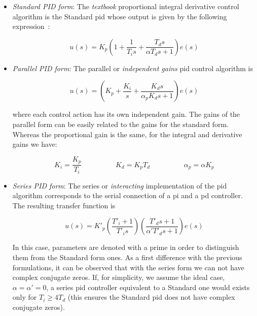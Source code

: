 \begin{itemize}
\item \emph{Standard PID form}: The \emph{textbook} proportional integral derivative control algorithm is the Standard \gls{pid} whose output is given by the following expression~\citep{astromhagglund1995}:

\begin{equation}
    u(s)= K_p \left( 1 + \frac{1}{T_i s} + \frac{T_d s}{\alpha T_d s+1} \right ) e(s)
    \label{eq:PIDstandard}
\end{equation}

\item \emph{Parallel PID form}: The parallel or \emph{independent gains} \gls{pid} control algorithm is

\begin{equation}
	u(s) =  \left( K_p + \frac{K_i}{s}+ \frac{K_d s}{\alpha_p K_d s+1}\right) e(s)
\end{equation}

\noindent where each control action has its own independent gain. The gains of the parallel form can be easily related to the gains for the standard form. Whereas the proportional gain is the same, for the integral and derivative gains we have:

\begin{equation}
K_i=\frac{K_p}{T_i} \hspace{2cm}  K_d=K_pT_d \hspace{2cm} \alpha_p = \alpha K_p
\end{equation} 

\item \emph{Series PID form}: The  series or \emph{interacting} implementation of the \gls{pid} algorithm corresponds to the serial connection of a \gls{pi} and a \gls{pd} controller. The resulting transfer function is

\begin{equation}
	u(s) = K'_p \left( \frac{T'_i+1}{T'_i s}\right) \left(\frac{T'_d s + 1}{\alpha' T'_d s +1}\right)e(s)
\end{equation}

In this case, parameters are denoted with a prime in order to distinguish them from the Standard form ones. As a first difference with the previous formulations, it can be observed that with the series form we can not have complex conjugate zeros. If, for simplicity, we assume the ideal case, $\alpha=\alpha'=0$, a series \gls{pid} controller equivalent to a Standard one would exists only for $T_i \ge 4 T_d$ (this ensures the Standard \gls{pid} does not have complex conjugate zeros).


\end{itemize}
